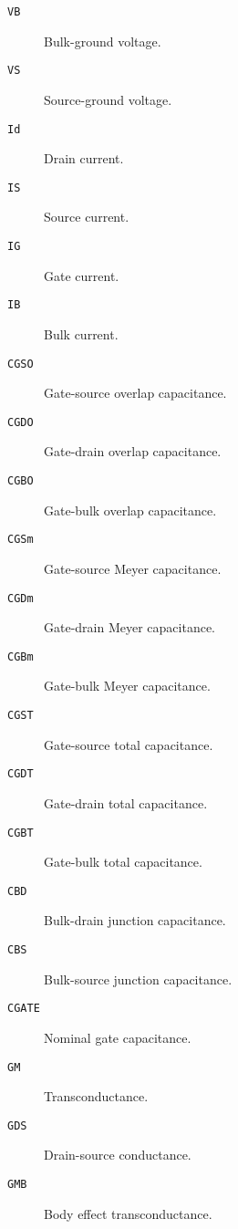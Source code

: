 \begin{description}
\item[{\tt VB}] Bulk-ground voltage.

\item[{\tt VS}] Source-ground voltage.

\item[{\tt Id}] Drain current.

\item[{\tt IS}] Source current.

\item[{\tt IG}] Gate current.

\item[{\tt IB}] Bulk current.

\item[{\tt CGSO}] Gate-source overlap capacitance.

\item[{\tt CGDO}] Gate-drain overlap capacitance.

\item[{\tt CGBO}] Gate-bulk overlap capacitance.

\item[{\tt CGSm}] Gate-source Meyer capacitance.

\item[{\tt CGDm}] Gate-drain Meyer capacitance.

\item[{\tt CGBm}] Gate-bulk Meyer capacitance.

\item[{\tt CGST}] Gate-source total capacitance.

\item[{\tt CGDT}] Gate-drain total capacitance.

\item[{\tt CGBT}] Gate-bulk total capacitance.

\item[{\tt CBD}] Bulk-drain junction capacitance.

\item[{\tt CBS}] Bulk-source junction capacitance.

\item[{\tt CGATE}] Nominal gate capacitance.

\item[{\tt GM}] Transconductance.

\item[{\tt GDS}] Drain-source conductance.

\item[{\tt GMB}] Body effect transconductance.


\end{description}
